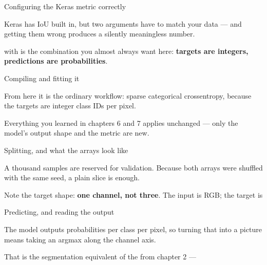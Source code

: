 \documentclass[aspectratio=169,11pt,t]{beamer}
\begin{document}
\begin{frame}[shrink=25]{Configuring the Keras metric correctly}
{\fontsize{9.4}{12.6}\selectfont\color{fg2}Keras has IoU built in, but two arguments have to match your data --- and getting them wrong produces a silently meaningless number.\par}\vskip 4pt
\begin{iband}[amber]
 with  is the combination you almost always want here: \textbf{targets are integers, predictions are probabilities}. 
\end{iband}
\end{frame}

\begin{frame}[shrink=25]{Compiling and fitting it}
{\fontsize{9.4}{12.6}\selectfont\color{fg2}From here it is the ordinary workflow: sparse categorical crossentropy, because the targets are integer class IDs per pixel.\par}\vskip 4pt
{\fontsize{9.4}{12.6}\selectfont\color{fg2}Everything you learned in chapters 6 and 7 applies unchanged --- only the model's output shape and the metric are new.\par}\vskip 4pt
\end{frame}

\begin{frame}[shrink=25]{Splitting, and what the arrays look like}
{\fontsize{9.4}{12.6}\selectfont\color{fg2}A thousand samples are reserved for validation. Because both arrays were shuffled with the same seed, a plain slice is enough.\par}\vskip 4pt
\begin{iband}[signal]
Note the target shape: \textbf{one channel, not three}. The input is RGB; the target is 
\end{iband}
\end{frame}

\begin{frame}[shrink=25]{Predicting, and reading the output}
{\fontsize{9.4}{12.6}\selectfont\color{fg2}The model outputs probabilities per class per pixel, so turning that into a picture means taking an argmax along the channel axis.\par}\vskip 4pt
{\fontsize{9.4}{12.6}\selectfont\color{fg2}That  is the segmentation equivalent of the  from chapter 2 --- \par}\vskip 4pt
\end{frame}
\end{document}
